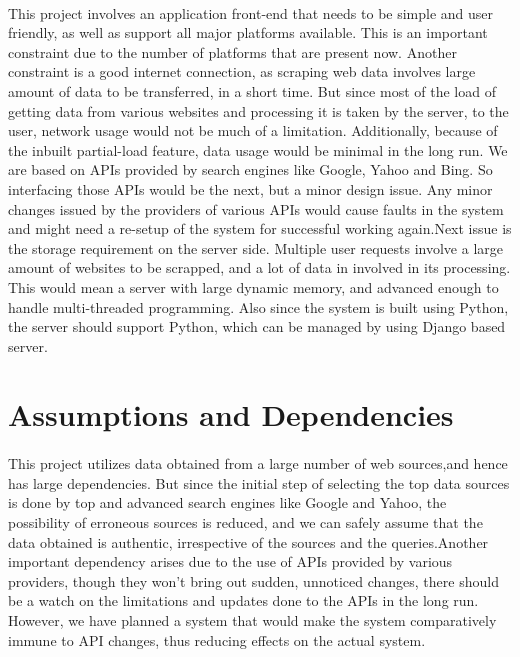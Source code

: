 \documentclass[a4paper]{report}
\begin{document}
\paragraph{}
\large\textnormal{This project involves an application front-end that needs to be simple and user friendly, as well as support all major platforms available. This is an important constraint due to the number of platforms that are present now. Another constraint is a good internet connection, as scraping web data involves large amount of data to be transferred, in a short time. But since most of the load of getting data from various websites and processing it is taken by the server, to the user, network usage would not be much of a limitation. Additionally, because of the inbuilt partial-load feature, data usage would be minimal in the long run. We are based on APIs provided by search engines like Google, Yahoo and 
Bing. So interfacing those APIs would be the next, but a minor design issue. Any minor changes issued by the providers of various APIs would cause faults in the system and might need a re-setup of the system for successful working again.Next issue is the storage requirement on the server side. Multiple user 
requests involve a large amount of websites to be scrapped, and a lot of data in involved in its processing. This would mean a server with large dynamic memory, and advanced enough to handle multi-threaded programming. Also since the system is built using Python, the server should support Python, which 
can be managed by using Django based server.}

\section{Assumptions and Dependencies}
\paragraph{}
\large\textnormal{This project utilizes data obtained from a large number of web sources,and hence has large dependencies. But since the initial step of selecting the top data sources is done by top and advanced search engines like Google and Yahoo, the possibility of erroneous sources is reduced, and we can safely assume that the data obtained is authentic, irrespective of the sources and the queries.Another important dependency arises due to the use of APIs provided by various providers, though they won’t bring out sudden, unnoticed changes, there should be a watch on the limitations and updates done to the APIs in the long run. However, we have planned a system that would make the system comparatively immune to API changes, thus reducing effects on the actual system.}
\end{document}
